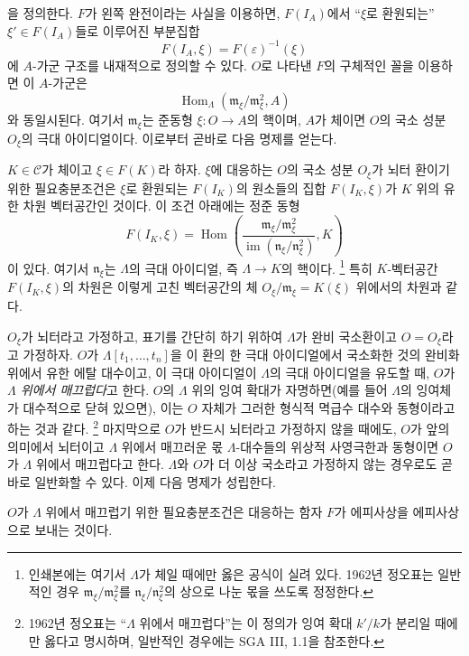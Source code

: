을 정의한다. $F$가 왼쪽 완전이라는 사실을 이용하면, $F(I_A)$에서
``$\xi$로 환원되는'' $\xi'\in F(I_A)$들로 이루어진 부분집합
\[
  F(I_A,\xi)=F(\varepsilon)^{-1}(\xi)
\]
에 $A$-가군 구조를 내재적으로 정의할 수 있다. $O$로 나타낸 $F$의
구체적인 꼴을 이용하면 이 $A$-가군은
\[
  \operatorname{Hom}_{\Lambda}(\mathfrak m_\xi/\mathfrak m_\xi^2,A)
\]
와 동일시된다. 여기서 $\mathfrak m_\xi$는 준동형
$\xi:O\longrightarrow A$의 핵이며, $A$가 체이면 $O$의 국소 성분
$O_\xi$의 극대 아이디얼이다. 이로부터 곧바로 다음 명제를 얻는다.

 $K\in\mathcal C$가 체이고 $\xi\in F(K)$라 하자.
$\xi$에 대응하는 $O$의 국소 성분 $O_\xi$가 뇌터 환이기 위한
필요충분조건은 $\xi$로 환원되는 $F(I_K)$의 원소들의 집합
$F(I_K,\xi)$가 $K$ 위의 유한 차원 벡터공간인 것이다. 이 조건 아래에는
정준 동형
\[
  F(I_K,\xi)=
  \operatorname{Hom}\!\left(
    \frac{\mathfrak m_\xi/\mathfrak m_\xi^2}
         {\operatorname{im}(\mathfrak n_\xi/\mathfrak n_\xi^2)},K
  \right)
\]
이 있다. 여기서 $\mathfrak n_\xi$는 $\Lambda$의 극대 아이디얼, 즉
$\Lambda\longrightarrow K$의 핵이다.
\footnote{인쇄본에는 여기서 $\Lambda$가 체일 때에만 옳은 공식이 실려
있다. 1962년 정오표는 일반적인 경우 $\mathfrak m_\xi/\mathfrak m_\xi^2$를
$\mathfrak n_\xi/\mathfrak n_\xi^2$의 상으로 나눈 몫을 쓰도록 정정한다.}
특히 $K$-벡터공간 $F(I_K,\xi)$의 차원은 이렇게 고친 벡터공간의 체
$O_\xi/\mathfrak m_\xi=K(\xi)$ 위에서의 차원과 같다.

$O_\xi$가 뇌터라고 가정하고, 표기를 간단히 하기 위하여 $\Lambda$가 완비
국소환이고 $O=O_\xi$라고 가정하자. $O$가 $\Lambda[t_1,\ldots,t_n]$을
이 환의 한 극대 아이디얼에서 국소화한 것의 완비화 위에서 유한 에탈
대수이고, 이 극대 아이디얼이 $\Lambda$의 극대 아이디얼을 유도할 때,
$O$가 \emph{$\Lambda$ 위에서 매끄럽다}고 한다. $O$의 $\Lambda$ 위의 잉여
확대가 자명하면(예를 들어 $\Lambda$의 잉여체가 대수적으로 닫혀 있으면),
이는 $O$ 자체가 그러한 형식적 멱급수 대수와 동형이라고 하는 것과 같다.
\footnote{1962년 정오표는 ``$\Lambda$ 위에서 매끄럽다''는 이 정의가 잉여
확대 $k'/k$가 분리일 때에만 옳다고 명시하며, 일반적인 경우에는 SGA III,
1.1을 참조한다.}
마지막으로 $O$가 반드시 뇌터라고 가정하지 않을 때에도, $O$가 앞의
의미에서 뇌터이고 $\Lambda$ 위에서 매끄러운 몫 $\Lambda$-대수들의 위상적
사영극한과 동형이면 $O$가 $\Lambda$ 위에서 매끄럽다고 한다. $\Lambda$와
$O$가 더 이상 국소라고 가정하지 않는 경우로도 곧바로 일반화할 수 있다.
이제 다음 명제가 성립한다.

 $O$가 $\Lambda$ 위에서 매끄럽기 위한 필요충분조건은
대응하는 함자 $F$가 에피사상을 에피사상으로 보내는 것이다.

